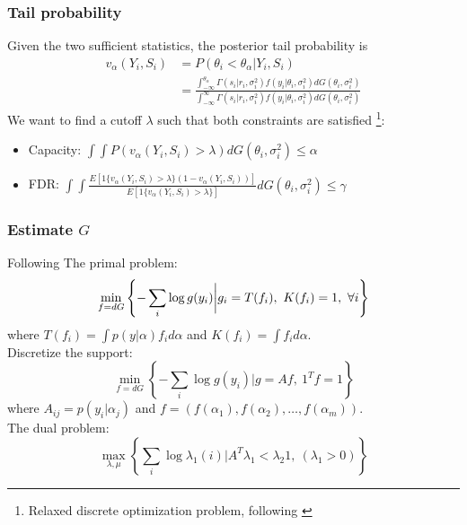\documentclass[10pt,mathserif,aspectratio=169]{beamer}
\begin{document}
\begin{frame}
  \frametitle{Tail probability}
  Given the two sufficient statistics, the posterior tail probability is
  \begin{align*}
    v_\alpha(Y_i,S_i) & = P( \theta_i < \theta_{\alpha} | Y_i,S_i)                                                                                 \\
                      & = \frac{{\int_{-\infty}^{\theta_{\alpha}} \Gamma(s_i|r_i,\sigma_i^2) f(y_i|\theta_i, \sigma_i^2) dG(\theta_i,\sigma_i^2)}}
    {{\int_{-\infty}^{\infty} \Gamma(s_i|r_i,\sigma_i^2) f(y_i|\theta_i, \sigma_i^2) dG(\theta_i,\sigma_i^2)}}
  \end{align*}
  We want to find a cutoff $\lambda$ such that both constraints are satisfied \footnote{Relaxed discrete optimization problem, following \citep{basu2018weighted}}:\\
  \begin{itemize}\itemsep=8pt
    \item Capacity: $\int \int P(v_\alpha(Y_i, S_i) > \lambda) dG(\theta_i,\sigma_i^2)
            \leq \alpha$
    \item FDR: $\int \int
            \frac{E[1\{v_\alpha(Y_i,S_i)>\lambda\}(1-v_\alpha(Y_i,S_i))]}{E[1\{v_\alpha(Y_i,S_i)>\lambda\}]}
            dG(\theta_i,\sigma_i^2) \leq \gamma$
  \end{itemize}
\end{frame}

\begin{frame}
  \frametitle{Estimate $G$}
  Following \citep{koenker2014convex,andersen2010mosek}
  The primal problem:
  \begin{equation*}
    \min_{f=dG}\left\{-\sum_i \log g(y_i)\bigg |g_i = T(f_i),\ K(f_i)=1,\ \forall i \right\}
  \end{equation*}
  where $ T(f_i)=\int p(y |\alpha)f_id\alpha $ and  $K(f_i)= \int f_i d\alpha$.\\
  Discretize the support:
  \begin{equation*}
    \min_{f=dG}\left\{-\sum_i \log g(y_i)\bigg |g=Af,\ {1^T}f=1\right\}
  \end{equation*}
  where $A_{ij}= p(y_i|\alpha_j) $ and $ f = (f(\alpha_1),f(\alpha_2),\ldots,f(\alpha_m))$.\\
  The dual problem:
  \begin{equation*}
    \max_{\lambda,\mu} \left\{ \sum_i \log \lambda_1(i) \bigg| A^T\lambda_1 < \lambda_2 1,\ (\lambda_1>0) \right\}
  \end{equation*}
\end{frame}
\end{document}
